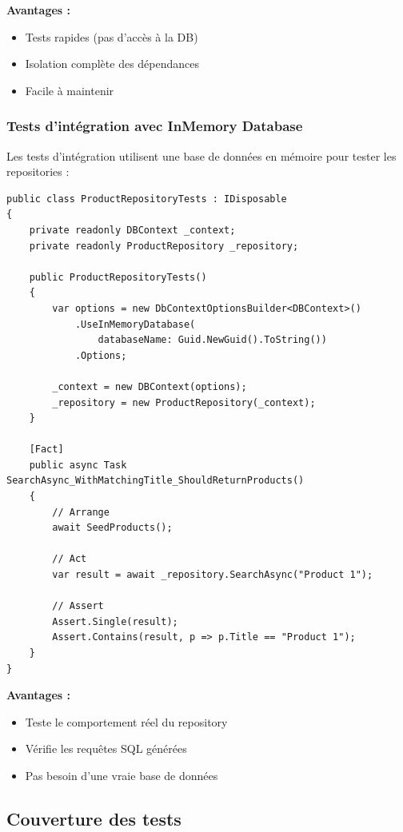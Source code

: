 \documentclass[12pt,a4paper]{article}
\begin{document}
\textbf{Avantages :}
\begin{itemize}
    \item Tests rapides (pas d'accès à la DB)
    \item Isolation complète des dépendances
    \item Facile à maintenir
\end{itemize}

\subsubsection{Tests d'intégration avec InMemory Database}

Les tests d'intégration utilisent une base de données en mémoire pour tester les repositories :

\begin{lstlisting}[caption=Exemple de test d'intégration, float=h!]
public class ProductRepositoryTests : IDisposable
{
    private readonly DBContext _context;
    private readonly ProductRepository _repository;

    public ProductRepositoryTests()
    {
        var options = new DbContextOptionsBuilder<DBContext>()
            .UseInMemoryDatabase(
                databaseName: Guid.NewGuid().ToString())
            .Options;

        _context = new DBContext(options);
        _repository = new ProductRepository(_context);
    }

    [Fact]
    public async Task SearchAsync_WithMatchingTitle_ShouldReturnProducts()
    {
        // Arrange
        await SeedProducts();

        // Act
        var result = await _repository.SearchAsync("Product 1");

        // Assert
        Assert.Single(result);
        Assert.Contains(result, p => p.Title == "Product 1");
    }
}
\end{lstlisting}

\textbf{Avantages :}
\begin{itemize}
    \item Teste le comportement réel du repository
    \item Vérifie les requêtes SQL générées
    \item Pas besoin d'une vraie base de données
\end{itemize}

\subsection{Couverture des tests}
\end{document}
